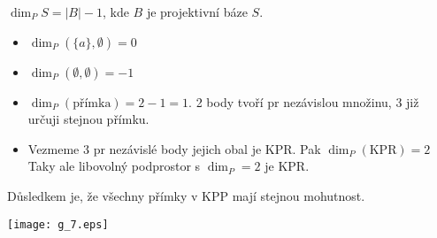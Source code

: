 \begin{definition}[Dimenze]
    $\dim_P S=|B|-1$, kde $B$ je projektivní báze $S$.
\end{definition}
\begin{note}[O dimenzi]
    \begin{itemize}
        \item $\dim_P(\{a\},\emptyset)=0$
        \item $\dim_P(\emptyset, \emptyset)=-1$
        \item $\dim_P(\text{přímka})=2-1=1$.
		2 body tvoří pr nezávislou množinu, 3 již určuji stejnou přímku.
        \item Vezmeme 3 pr nezávislé body jejich obal je KPR. Pak $\dim_P(\text{KPR})=2$
		Taky ale libovolný podprostor s $\dim_P = 2$ je KPR.
    \end{itemize}

    Důsledkem je, že všechny přímky v KPP mají stejnou mohutnost.

    \texttt{[image: g\_7.eps]}
\end{note}

